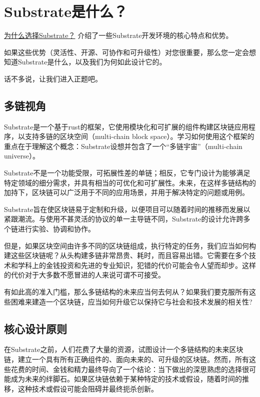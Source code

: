 \section{Substrate是什么？}

\href{/fundamentals/why-substrate/}{为什么选择Substrate？}
介绍了一些Substrate开发环境的核心特点和优势。

如果这些优势（灵活性、开源、可协作和可升级性）对您很重要，那么您一定会想知道Substrate是什么，以及我们为何如此设计它的。

话不多说，让我们进入正题吧。

\hypertarget{ux591aux94feux89c6ux89d2}{%
\subsection{多链视角}\label{ux591aux94feux89c6ux89d2}}

Substrate是一个基于rust的框架，它使用模块化和可扩展的组件构建区块链应用程序，以支持多链的区块空间（multi-chain
block
space）。学习如何使用这个框架的重点在于理解这个概念：Substrate设想并包含了一个``多链宇宙''（multi-chain
universe）。

Substrate不是一个功能受限，可拓展性差的单链；相反，它专门设计为能够满足特定领域的细分需求，并具有相当的可优化和可扩展性。未来，在这样多链结构的加持下，区块链可以广泛用于不同的应用场景，并用于解决特定的问题或用例。

Substrate旨在使区块链易于定制和升级，以便项目可以随着时间的推移而发展以紧跟潮流。与使用不甚灵活的协议的单一主导链不同，Substrate的设计允许跨多个链进行实验、协调和协作。

但是，如果区块空间由许多不同的区块链组成，执行特定的任务，我们应当如何构建这些区块链呢？从头构建多链非常昂贵、耗时，而且容易出错。它需要在多个技术和学科上的金钱投资和先进的专业知识，犯错的代价可能会令人望而却步。这样的代价对于大多数不愿冒进的人来说可谓不可接受。

有如此高的准入门槛，那么多链结构的未来应当何去何从？如果我们要克服所有这些困难来建造一个区块链，应当如何升级它以保持它与社会和技术发展的相关性?

\hypertarget{ux6838ux5fc3ux8bbeux8ba1ux539fux5219}{%
\subsection{核心设计原则}\label{ux6838ux5fc3ux8bbeux8ba1ux539fux5219}}

在Substrate之前，人们花费了大量的资源，试图设计一个多链结构的未来区块链，建立一个具有所有正确组件的、面向未来的、可升级的区块链。然而，所有这些花费的时间、金钱和精力最终导向了一个结论：当下做出的深思熟虑的选择很可能成为未来的绊脚石。如果区块链依赖于某种特定的技术或假设，随着时间的推移，这种技术或假设可能会阻碍并最终扼杀创新。

